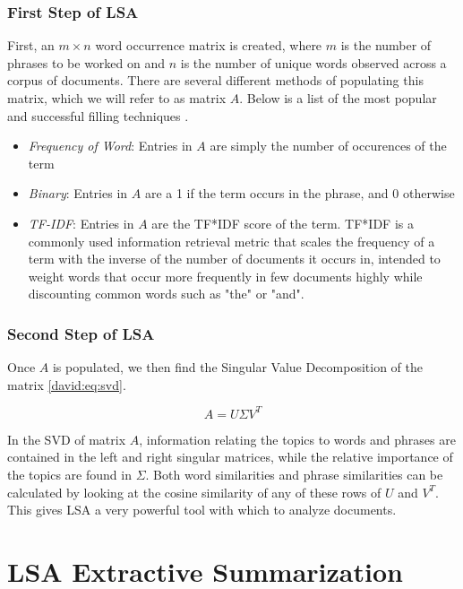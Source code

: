 \documentclass[../writeup.tex]{subfiles}
\begin{document}
\subsubsection{First Step of LSA}\label{david:sec:intro:motivation:1step}

First, an $m\times n$ word occurrence matrix is created, where $m$ is the number of phrases to be worked on and $n$ is the number of unique words observed across a corpus of documents. 
There are several different methods of populating this matrix, which we will refer to as matrix $A$. 
Below is a list of the most popular and successful filling techniques \autocite{lsa-overview}.

\begin{itemize}
    \item \emph{Frequency of Word}: Entries in $A$ are simply the number of occurences of the term
    \item \emph{Binary}: Entries in $A$ are a 1 if the term occurs in the phrase, and 0 otherwise
    \item \emph{TF-IDF}: Entries in $A$ are the TF*IDF score of the term. TF*IDF is a commonly used information retrieval metric that scales the frequency of a term with the inverse of the number of documents it occurs in, intended to weight words that occur more frequently in few documents highly while discounting common words such as "the" or "and".
\end{itemize}


\subsubsection{Second Step of LSA}\label{david:sec:intro:motivation:2step}

Once $A$ is populated, we then find the Singular Value Decomposition of the matrix \eqref{david:eq:svd}.


\begin{equation} \label{david:eq:svd}
    A = U \Sigma V^T
\end{equation}

In the SVD of matrix $A$, information relating the topics to words and phrases are contained in the left and right singular matrices, while the relative importance of the topics are found in $\Sigma$.
Both word similarities and phrase similarities can be calculated by looking at the cosine similarity of any of these rows of $U$ and $V^T$. 
This gives LSA a very powerful tool with which to analyze documents. 

\section{LSA Extractive Summarization}\label{david:sec:lsa}
\end{document}
